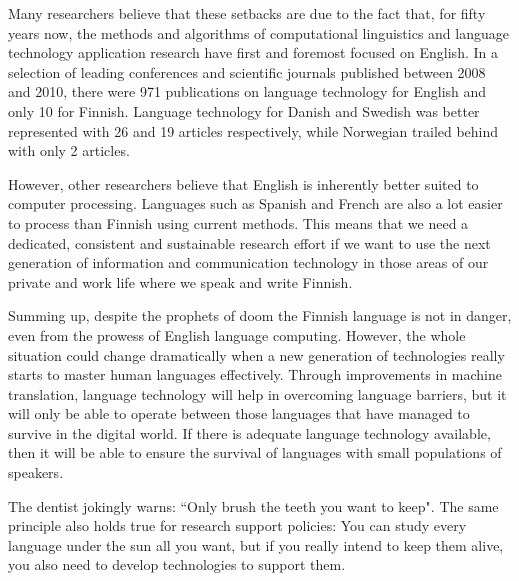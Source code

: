 \begin{multicols}{2}
Many researchers believe that these setbacks are due to the fact that, for fifty years now, the methods and algorithms of computational linguistics and language technology application research have first and foremost focused on English. In a selection of leading conferences and scientific journals published between 2008 and 2010, there were 971 publications on language technology for English and only 10 for Finnish. Language technology for Danish and Swedish was better represented with 26 and 19 articles respectively, while Norwegian trailed behind with only 2 articles.
 
However, other researchers believe that English is inherently better suited to computer processing. Languages such as Spanish and French are also a lot easier to process than Finnish using current methods. This means that we need a dedicated, consistent and sustainable research effort if we want to use the next generation of information and communication technology in those areas of our private and work life where we speak and write Finnish.

Summing up, despite the prophets of doom the Finnish language is not in danger, even from the prowess of English language computing. However, the whole situation could change dramatically when a new generation of technologies really starts to master human languages effectively. Through improvements in machine translation, language technology will help in overcoming language barriers, but it will only be able to operate between those languages that have managed to survive in the digital world. If there is adequate language technology available, then it will be able to ensure the survival of languages with small populations of speakers.


The dentist jokingly warns: ``Only brush the teeth you want to keep".
The same principle also holds true for research support policies: You can study every language under the sun all you want, but if you really
intend to keep them alive, you also need to develop technologies to support them.


\end{multicols}
